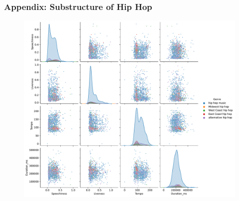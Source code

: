 \begin{frame}
    \frametitle{Appendix: Substructure of Hip Hop}
    \begin{figure}
        \includegraphics[scale=0.3]{../figures/pairplots/pairplot_hip_v3.pdf}
    \end{figure}
\end{frame}